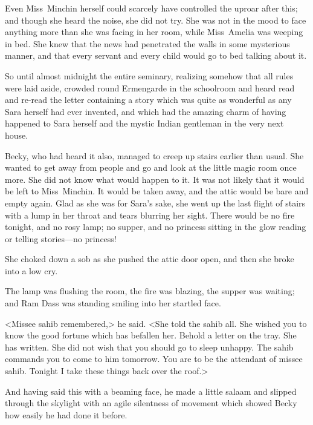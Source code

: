 Even Miss~Minchin herself could scarcely have controlled the uproar after this; and though she heard the noise, she did not try. She was not in the mood to face anything more than she was facing in her room, while Miss~Amelia was weeping in bed. She knew that the news had penetrated the walls in some mysterious manner, and that every servant and every child would go to bed talking about it.

So until almost midnight the entire seminary, realizing somehow that all rules were laid aside, crowded round Ermengarde in the schoolroom and heard read and re-read the letter containing a story which was quite as wonderful as any Sara herself had ever invented, and which had the amazing charm of having happened to Sara herself and the mystic Indian gentleman in the very next house.

Becky, who had heard it also, managed to creep up stairs earlier than usual. She wanted to get away from people and go and look at the little magic room once more. She did not know what would happen to it. It was not likely that it would be left to Miss~Minchin. It would be taken away, and the attic would be bare and empty again. Glad as she was for Sara's sake, she went up the last flight of stairs with a lump in her throat and tears blurring her sight. There would be no fire tonight, and no rosy lamp; no supper, and no princess sitting in the glow reading or telling stories—no princess!

She choked down a sob as she pushed the attic door open, and then she broke into a low cry.

The lamp was flushing the room, the fire was blazing, the supper was waiting; and Ram Dass was standing smiling into her startled face.

<Missee sahib remembered,> he said. <She told the sahib all. She wished you to know the good fortune which has befallen her. Behold a letter on the tray. She has written. She did not wish that you should go to sleep unhappy. The sahib commands you to come to him tomorrow. You are to be the attendant of missee sahib. Tonight I take these things back over the roof.>

And having said this with a beaming face, he made a little salaam and slipped through the skylight with an agile silentness of movement which showed Becky how easily he had done it before.